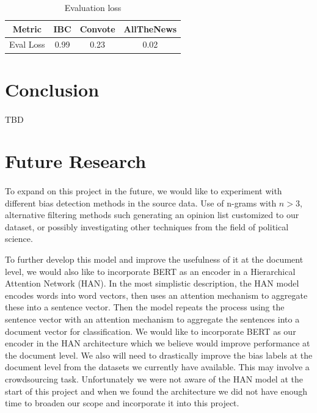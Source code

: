 \documentclass[10pt,a4paper,onecolumn]{article}
\begin{document}
\begin{table}[h!]
\centering
\begin{tabular}{||c c c c||} 
 \hline
 Metric & IBC & Convote & AllTheNews \\ [0.5ex] 
 \hline\hline
 Eval Loss & 0.99 & 0.23 & 0.02 \\ [1ex]
 \hline
\end{tabular}
\caption{Evaluation loss}
\label{table:1}
\end{table}

\section{Conclusion}
\paragraph{}
TBD

\section*{Future Research}
\paragraph{}
To expand on this project in the future, we would like to experiment with different bias detection methods in the source data. Use of n-grams with $ n > 3 $, alternative filtering methods such generating an opinion list customized to our dataset, or possibly investigating other techniques from the field of political science. 

To further develop this model and improve the usefulness of it at the document level, we would also like to incorporate BERT as an encoder in a Hierarchical Attention Network (HAN). In the most simplistic description, the HAN model encodes words into word vectors, then uses an attention mechanism to aggregate these into a sentence vector. Then the model repeats the process using the sentence vector with an attention mechanism to aggregate the sentences into a document vector for classification. We would like to incorporate BERT as our encoder in the HAN architecture which we believe would improve performance at the document level. We also will need to drastically improve the bias labels at the document level from the datasets we currently have available. This may involve a crowdsourcing task. Unfortunately we were not aware of the HAN model at the start of this project and when we found the architecture we did not have enough time to broaden our scope and incorporate it into this project.



\end{document}
